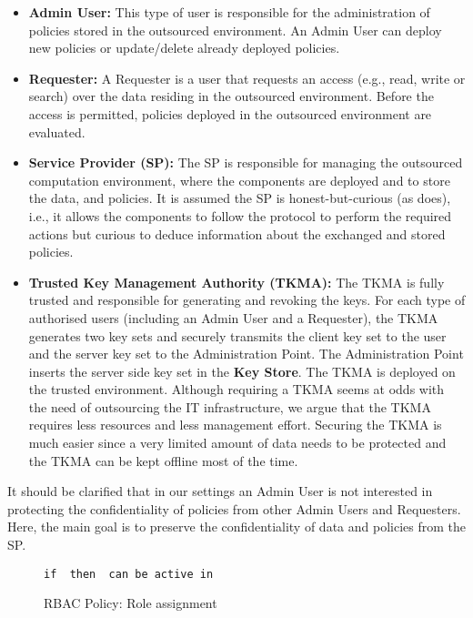 \documentclass[final,5p,times,twocolumn]{elsarticle}
\newcommand{\Keywords}{\lstset{keywords={if,then,can,be,active,in,execute}}}
\begin{document}
\begin{itemize}

\item \textbf{Admin User:} This type of user is responsible for the administration of policies stored in the outsourced environment. An Admin User can deploy new policies or update/delete already deployed policies.

\item \textbf{Requester:} A Requester is a user that requests an access (e.g., read, write or search) over the data residing in the outsourced environment. Before the access is permitted, policies deployed in the outsourced environment are evaluated.

\item \textbf{Service Provider (SP):} The SP is responsible for managing the outsourced computation environment, where the  components are deployed and to store the data, and policies. It is assumed the SP is honest-but-curious (as \cite{Vimercati2007} does), i.e., it allows the components to follow the protocol to perform the required actions but curious to deduce information about the exchanged and stored policies.

\item \textbf{Trusted Key Management Authority (TKMA):} The TKMA is fully trusted and responsible for generating and revoking the keys. For each type of authorised users (including an Admin User and a Requester), the TKMA generates two key sets and securely transmits the client key set to the user and the server key set to the Administration Point. The Administration Point inserts the server side key set in the \textbf{Key Store}. The TKMA is deployed on the trusted environment. Although requiring a TKMA seems at odds with the need of outsourcing the IT infrastructure, we argue that the TKMA requires less resources and less management effort. Securing the TKMA is much easier since a very limited amount of data needs to be protected and the TKMA can be kept offline most of the time.

\end{itemize}

It should be clarified that in our settings an Admin User is not interested in protecting the confidentiality of policies from other Admin Users and Requesters. Here, the main goal is to preserve the confidentiality of data and policies from the SP.

\begin{figure}
\Keywords
\begin{lstlisting}[style=AMMA,numbers=none,breaklines,mathescape,rulesepcolor=\color{black}]
if  then  can be active in 

\end{lstlisting}
\caption{RBAC Policy: Role assignment}
\label{fig:policy-role-assignment}
\end{figure}
\end{document}
